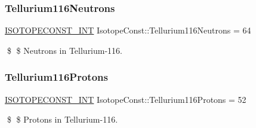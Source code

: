 \subsubsection{\texorpdfstring{Tellurium116\+Neutrons}{Tellurium116Neutrons}}
{\footnotesize\ttfamily \mbox{\hyperlink{group___isotope_const-_macros_ga5f18360b3e99483a35c32d789e62621c}{I\+S\+O\+T\+O\+P\+E\+C\+O\+N\+S\+T\+\_\+\+I\+NT}} Isotope\+Const\+::\+Tellurium116\+Neutrons = 64}

\$ \$ Neutrons in Tellurium-\/116. \mbox{\label{group___isotope_const-_tellurium-_te116_gad69c7611b51d14b5c975473b6ed995d7}} 
\subsubsection{\texorpdfstring{Tellurium116\+Protons}{Tellurium116Protons}}
{\footnotesize\ttfamily \mbox{\hyperlink{group___isotope_const-_macros_ga5f18360b3e99483a35c32d789e62621c}{I\+S\+O\+T\+O\+P\+E\+C\+O\+N\+S\+T\+\_\+\+I\+NT}} Isotope\+Const\+::\+Tellurium116\+Protons = 52}

\$ \$ Protons in Tellurium-\/116. 